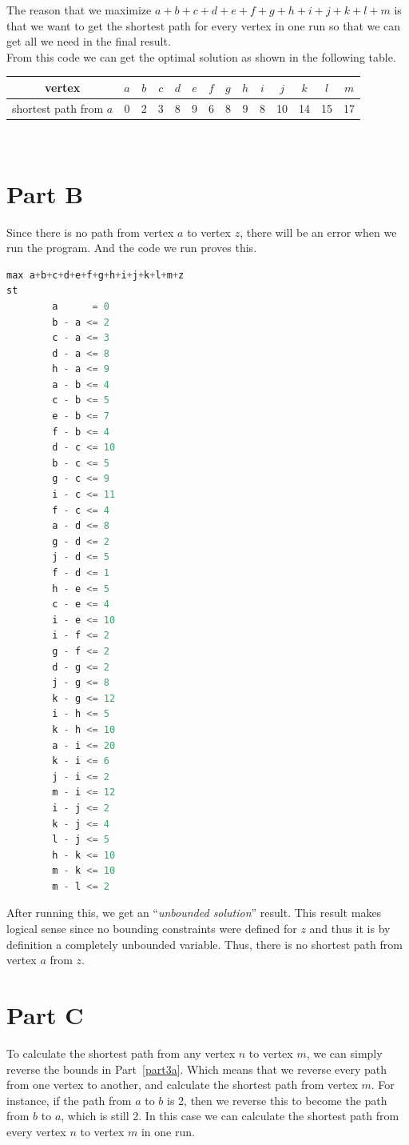 \documentclass[11pt]{scrreprt}
\begin{document}
The reason that we maximize $a+b+c+d+e+f+g+h+i+j+k+l+m$ is that we want to get the shortest path for every vertex in one run so that we can get all we need in the final result.\\

From this code we can get the optimal solution as shown in the following table.\\
\begin{tabular}{|c|c|c|c|c|c|c|c|c|c|c|c|c|c|}
	\hline vertex & $a$   &  $b$ & $c$ & $d$ & $e$ & $f$ & $g$ & $h$ & $i$  & $j$ & $k$ & $l$ & $m$   \\
	\hline shortest path from $a$ & 0 & 2 & 3 & 8 & 9 & 6 & 8 & 9 & 8 & 10 & 14 & 15 & 17       \\
	\hline
\end{tabular} \\

\section{Part B}\label{part3b}
Since there is no path from vertex $a$ to vertex $z$, there will be an error when we run the program. And the code we run proves this.
\begin{lstlisting}[language=c]
max a+b+c+d+e+f+g+h+i+j+k+l+m+z
st
        a      = 0 
        b - a <= 2
        c - a <= 3
        d - a <= 8
        h - a <= 9
        a - b <= 4
        c - b <= 5
        e - b <= 7
        f - b <= 4
        d - c <= 10
        b - c <= 5
        g - c <= 9
        i - c <= 11
        f - c <= 4
        a - d <= 8
        g - d <= 2
        j - d <= 5
        f - d <= 1
        h - e <= 5
        c - e <= 4
        i - e <= 10
        i - f <= 2
        g - f <= 2
        d - g <= 2
        j - g <= 8
        k - g <= 12
        i - h <= 5
        k - h <= 10
        a - i <= 20
        k - i <= 6
        j - i <= 2
        m - i <= 12
        i - j <= 2
        k - j <= 4
        l - j <= 5
        h - k <= 10
        m - k <= 10
        m - l <= 2
\end{lstlisting}
 After running this, we get an ``{\it unbounded solution}'' result. This result makes logical sense since no bounding constraints were defined for $z$ and thus it is by definition a completely unbounded variable. Thus, there is no shortest path from vertex $a$ from $z$.
 
\section{Part C}\label{part3c}
To calculate the shortest path from any vertex $n$ to vertex $m$, we can simply reverse the bounds in Part~\ref{part3a}. Which means that we reverse every path from one vertex to another, and calculate the shortest path from vertex $m$. For instance, if the path from $a$ to $b$ is 2, then we reverse this to become the path from $b$ to $a$, which is still 2. In this case we can calculate the shortest path from every vertex $n$ to vertex $m$ in one run.
\end{document}
